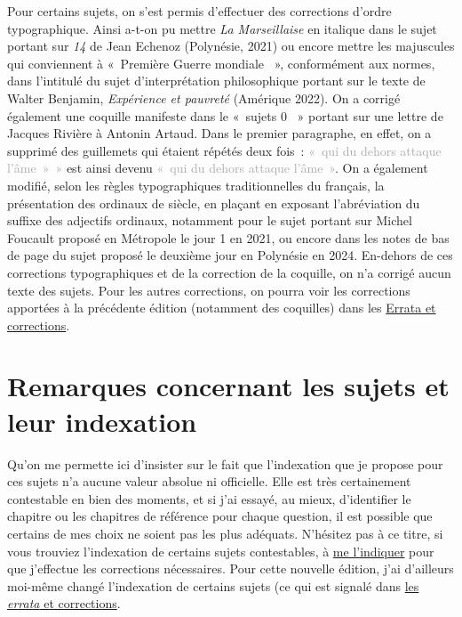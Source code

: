 Pour certains sujets, on s'est permis d'effectuer des corrections d'ordre typographique. Ainsi a-t-on pu mettre \textit{La Marseillaise} en italique dans le sujet portant sur \textit{14} de Jean Echenoz (Polynésie, 2021) ou encore mettre les majuscules qui conviennent à «~Première Guerre mondiale ~», conformément aux normes, dans l'intitulé du sujet d'interprétation philosophique portant sur le texte de Walter Benjamin, \textit{Expérience et pauvreté} (Amérique 2022). On a corrigé également une coquille manifeste dans le «~sujets 0 ~» portant sur une lettre de Jacques Rivière à Antonin Artaud. Dans le premier paragraphe, en effet, on a supprimé des guillemets qui étaient répétés deux fois~: \textcolor{darkgray}{«~qui du dehors attaque l’âme~»~»} est ainsi devenu \textcolor{darkgray}{«~qui du dehors attaque l’âme~»}. On a également modifié, selon les règles typographiques traditionnelles du français, la présentation des ordinaux de siècle, en plaçant en exposant l'abréviation du suffixe des adjectifs ordinaux, notamment pour le sujet portant sur Michel Foucault proposé en Métropole le jour 1 en 2021, ou encore dans les notes de bas de page du sujet proposé le deuxième jour en Polynésie en 2024. En-dehors de ces corrections typographiques et de la correction de la coquille, on n'a corrigé aucun texte des sujets. Pour les autres corrections, on pourra voir les corrections apportées à la précédente édition (notamment des coquilles) dans les \hyperlink{errata}{Errata et corrections}.

\section*{Remarques concernant les sujets et leur indexation}

Qu'on me permette ici d'insister sur le fait que l'indexation que je propose pour ces sujets n'a aucune valeur absolue ni officielle. Elle est très certainement contestable en bien des moments, et si j'ai essayé, au mieux, d'identifier le chapitre ou les chapitres de référence pour chaque question, il est possible que certains de mes choix ne soient pas les plus adéquats. N'hésitez pas à ce titre, si vous trouviez l'indexation de certains sujets contestables, à \href{mailto:mikael.quesseveur@ac-lille.fr}{me l'indiquer} pour que j'effectue les corrections nécessaires. Pour cette nouvelle édition, j'ai d'ailleurs moi-même changé l'indexation de certains sujets (ce qui est signalé dans \hyperlink{errata}{les \textit{errata} et corrections}.

